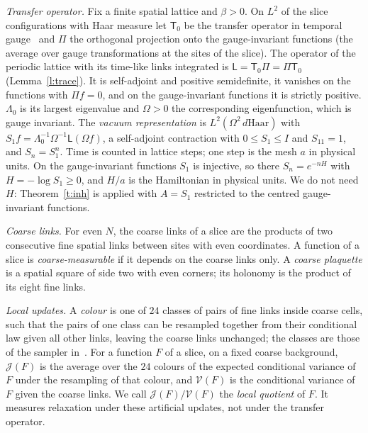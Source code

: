 \emph{Transfer operator.} Fix a finite spatial lattice and $\beta>0$. On $L^2$ of the slice configurations
with Haar measure let $\mathsf T_0$ be the transfer operator in temporal gauge~\cite{Lu77,OS78} and $\Pi$ the
orthogonal projection onto the gauge-invariant functions (the average over gauge transformations at the
sites of the slice). The operator of the periodic lattice with its time-like links integrated is
$\mathsf L=\mathsf T_0\Pi=\Pi\mathsf T_0$ (Lemma~\ref{l:trace}). It is self-adjoint and positive semidefinite, it
vanishes on the functions with $\Pi f=0$, and on the gauge-invariant functions it is strictly positive.
$\Lambda_0$ is its largest eigenvalue and $\Omega>0$ the corresponding eigenfunction, which is gauge invariant.
The \emph{vacuum representation} is $L^2(\Omega^2\,d\mathrm{Haar})$ with
$S_1f=\Lambda_0^{-1}\Omega^{-1}\mathsf L(\Omega f)$, a self-adjoint contraction with $0\le S_1\le I$ and $S_11=1$,
and $S_n=S_1^n$. Time is counted in lattice steps; one step is the mesh $a$ in physical units. On the
gauge-invariant functions $S_1$ is injective, so there $S_n=e^{-nH}$ with $H=-\log S_1\ge0$, and $H/a$ is the
Hamiltonian in physical units. We do not need $H$: Theorem~\ref{t:inh} is applied with $A=S_1$ restricted to the
centred gauge-invariant functions.

\emph{Coarse links.} For even $N$, the coarse links of a slice are the products of two consecutive fine
spatial links between sites with even coordinates. A function of a slice is \emph{coarse-measurable} if it
depends on the coarse links only. A \emph{coarse plaquette} is a spatial square of side two with even corners;
its holonomy is the product of its eight fine links.

\emph{Local updates.} A \emph{colour} is one of $24$ classes of pairs of fine links inside coarse cells, such
that the pairs of one class can be resampled together from their conditional law given all other links,
leaving the coarse links unchanged; the classes are those of the sampler in~\cite{RepoData}. For a function
$F$ of a slice, on a fixed coarse background, $\mathcal J(F)$ is the average over the $24$ colours of the
expected conditional variance of $F$ under the resampling of that colour, and $\mathcal V(F)$ is the
conditional variance of $F$ given the coarse links. We call $\mathcal J(F)/\mathcal V(F)$ the \emph{local
quotient} of $F$. It measures relaxation under these artificial updates, not under the transfer operator.

